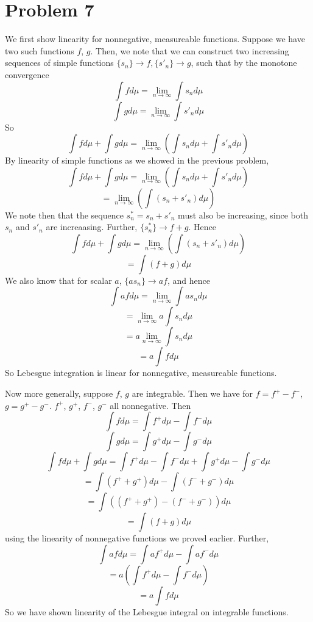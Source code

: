 \documentclass[10pt,letter]{article}
\begin{document}
\section*{Problem 7}
We first show linearity for nonnegative, measureable functions. Suppose we have two such functions $f$, $g$. Then, we note that we can construct two increasing sequences of simple functions $\{ s_n \} \to f, \{ s'_n \} \to g$, such that by the monotone convergence
\[ \int f d\mu = \lim_{n \to \infty} \int s_n d\mu \]
\[ \int g d\mu = \lim_{n \to \infty} \int s'_n d\mu \]
So
\[ \int f d\mu + \int g d\mu = \lim_{n \to \infty}\left( \int s_n d\mu + \int s'_n d\mu \right) \]
By linearity of simple functions as we showed in the previous problem,
\[ \int f d\mu + \int g d\mu = \lim_{n \to \infty}\left( \int s_n d\mu + \int s'_n d\mu \right) \]
\[ = \lim_{n \to \infty}\left( \int (s_n + s'_n) d\mu \right) \]
We note then that the sequence $s^*_n = s_n + s'_n$ must also be increasing, since both $s_n$ and $s'_n$ are increaasing. Further, $\{ s^*_n \} \to f+g$.
Hence
\[ \int f d\mu + \int g d\mu = \lim_{n \to \infty}\left( \int (s_n + s'_n) d\mu \right) \]
\[ = \int (f + g) d\mu \]
We also know that for scalar $a$, $\{ as_n \} \to af$, and hence
\[ \int af d \mu =  \lim_{n \to \infty} \int a s_n d\mu\]
\[  =  \lim_{n \to \infty} a \int s_n d\mu\]
\[ = a \lim_{n \to \infty} \int s_n d\mu \]
\[ = a \int f d\mu \]
So Lebesgue integration is linear for nonnegative, measureable functions.

Now more generally, suppose $f$, $g$ are integrable. Then we have
for $f = f^+ - f^-$, $g = g^+ - g^-$. $f^+$, $g^+$, $f^-$, $g^-$ all nonnegative. Then
\[ \int f d \mu = \int f^+ d\mu - \int f^- d\mu \]
\[ \int g d \mu = \int g^+ d\mu - \int g^- d\mu \]
\[ \int f d \mu + \int g d \mu =  \int f^+ d\mu - \int f^- d\mu + \int g^+ d\mu - \int g^- d\mu\]
\[ = \int (f^+ + g^+) d\mu - \int (f^- + g^-) d\mu  \]
\[ = \int ((f^+ + g^+)  - (f^- + g^-)) d\mu  \]
\[ = \int (f + g) d\mu \]
using the linearity of nonnegative functions we proved earlier. Further,
\[ \int af d\mu = \int af^+ d\mu - \int af^- d\mu \]
\[ = a \left(\int f^+ d\mu - \int f^- d\mu \right) \]
\[ = a \int f d\mu \]
So we have shown linearity of the Lebesgue integral on integrable functions.
\end{document}

